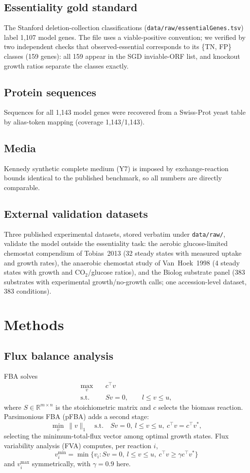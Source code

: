 \documentclass[12pt]{article}
\begin{document}
\subsection{Essentiality gold standard}
The Stanford deletion-collection classifications
(\texttt{data/raw/essentialGenes.tsv}) label 1{,}107 model genes. The file
uses a viable-positive convention; we verified by two independent checks
that observed-essential corresponds to its \{TN, FP\} classes (159 genes):
all 159 appear in the SGD inviable-ORF list, and knockout growth ratios
separate the classes exactly.
\subsection{Protein sequences}
Sequences for all 1{,}143 model genes were recovered from a Swiss-Prot
yeast table by alias-token mapping (coverage 1{,}143/1{,}143).
\subsection{Media}
Kennedy synthetic complete medium (Y7) is imposed by exchange-reaction
bounds identical to the published benchmark, so all numbers are directly
comparable.
\subsection{External validation datasets}
Three published experimental datasets, stored verbatim under
\texttt{data/raw/}, validate the model outside the essentiality task:
the aerobic glucose-limited chemostat compendium of Tobias~2013
(32 steady states with measured uptake and growth rates), the anaerobic
chemostat study of Van~Hoek~1998 (4 steady states with growth and
CO$_2$/glucose ratios), and the Biolog substrate panel (383 substrates
with experimental growth/no-growth calls; one accession-level dataset,
383 conditions).

\section{Methods}
\subsection{Flux balance analysis}
FBA solves
\begin{align}
\max_{v}\quad & c^{\top} v \label{eq:fba}\\
\text{s.t.}\quad & S v = 0,\qquad l \le v \le u, \nonumber
\end{align}
where $S\in\mathbb{R}^{m\times n}$ is the stoichiometric matrix and $c$
selects the biomass reaction. Parsimonious FBA (pFBA) adds a second stage:
\begin{equation}
\min_{v}\ \lVert v\rVert_1 \quad \text{s.t.}\quad Sv=0,\ l\le v\le u,\
c^{\top}v = c^{\top}v^{*}, \label{eq:pfba}
\end{equation}
selecting the minimum-total-flux vector among optimal growth states. Flux
variability analysis (FVA) computes, per reaction $i$,
\begin{equation}
v_i^{\min} = \min\{v_i : Sv=0,\ l\le v\le u,\ c^{\top}v\ge \gamma c^{\top}v^{*}\}
\label{eq:fva}
\end{equation}
and $v_i^{\max}$ symmetrically, with $\gamma=0.9$ here.
\end{document}
